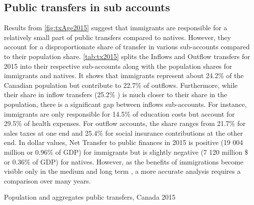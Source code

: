 \subsection{Public transfers in sub accounts}
Results from \autoref{fig:txAge2015} suggest that immigrants are responsible for a relatively small part of public transfers compared to natives.
However, they account for a disproportionate share of transfer in various sub-accounts compared to their population share.
\autoref{tab:tx2015} splits the Inflows and Outflow transfers for 2015 into their respective sub-accounts along with the population shares for immigrants and natives.
It shows that immigrants represent about 24.2\% of the Canadian population but contribute to 22.7\% of outflows.
Furthermore, while their share in inflow transfers (25.2\% ) is much closer to their share in the population, there is a significant gap between inflows sub-accounts.
For instance, immigrants are only responsible for 14.5\% of education costs but account for 29.5\% of health expenses.
For outflow accounts, the share ranges from 21.7\% for sales taxes at one end and 25.4\% for social insurance contributions at the other end.
In dollar values, Net Transfer to public finances in 2015 is positive (19 004 million or 0.96\% of GDP) for immigrants but is slightly negative (7 120 million \$ or 0.36\% of GDP) for natives.
However, as the benefits of immigrations become visible only in the medium and long term \citep{Goldin:2011tg}, a more accurate analysis requires a comparison over many years.

  \begin{table}[H]%
    \caption{Population and aggregates public transfers, Canada 2015}
    \label{tab:tx2015}%
    \begin{center}
   \end{center}
\end{table}%
